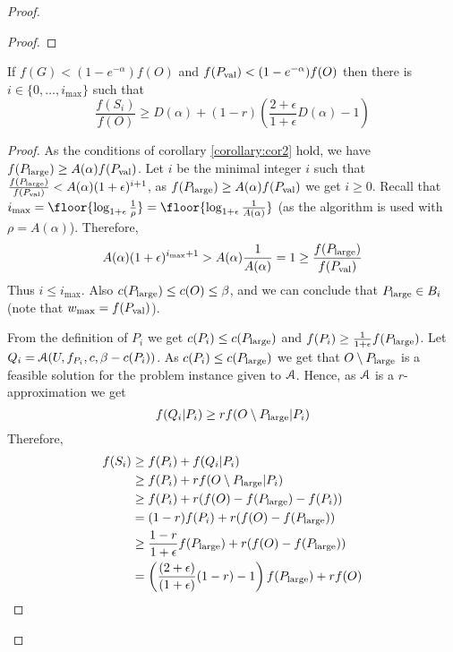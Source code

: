 \documentclass[a4paper,UKenglish,cleveref, autoref]{lipics-v2019}
\begin{document}
\begin{proof}
\begin{proof}
			
		\end{proof}

	\begin{corollary}
		\label{corollary:cor3}
			If $f(G)< (1-e^{-\alpha})f(O)$ and $f(P_{\text{val}}) < (1-e^{-\alpha})f(O)$ then
			there is $i\in \{0, \ldots, i_{\max}\}$ such that
		$$\frac{f(S_i)}{f(O)} \geq D(\alpha) + (1-r)\left( \frac{2+\epsilon}{1+\epsilon} D(\alpha) -1 \right)$$
	\end{corollary}
\begin{proof}
		As the conditions of corollary \ref{corollary:cor2} hold, we have
		$f(P_{\text{large}}) \geq A(\alpha) f(P_{\text{val}})$.
		 Let $i$ be the minimal integer $i$ such
		that $\frac{f(P_{\text{large}})}{f(P_{\text{val}})} < A(\alpha)(1+\epsilon) ^{i+1}$, as $f(P_{\text{large}}) \geq A(\alpha) f(P_{\text{val}})$ we get $i\geq 0$.
		Recall that $i_{\max}= \floor{\log_{1+\epsilon} \frac{1}{\rho} } =
		\floor{\log_{1+\epsilon} \frac{1}{A(\alpha)}} $ (as the algorithm is used
			with $\rho=A(\alpha)$).
			Therefore,
			$$A(\alpha) (1+\epsilon) ^{i_{\max} +1}
			> A(\alpha) \frac{1}{A(\alpha) } = 1 \geq \frac{f(P_{\text{large}})}{f(P_{\text{val}})}$$
			Thus $i\leq i_{\max}$.
			Also $c(P_{\text{large}}) \leq c(O) \leq \beta$, and we can conclude that
			$P_{\text{large}} \in B_i$ (note that $w_{\max} = f(P_{\text{val}})$).
			
			From the definition of $P_i$ we get $c(P_i)\leq c(P_{\text{large}})$ and
			$f(P_i) \geq \frac{1}{1+\epsilon} f(P_{\text{large}})$.
			Let $Q_i  =  \mathcal{A}(U, f_{P_i}, c, \beta - c(P_i))$.
			As $c(P_i) \leq c(P_{\text{large}})$ we get that $O\setminus P_{\text{large}}$
			is a feasible solution for the problem instance given to $\mathcal{A}$.
			Hence, as $\mathcal{A}$ is a $r$-approximation we get
			$$f(Q_i | P_i) \geq r f(O\setminus P_{\text{large}}| P_i)$$
			Therefore,
			\begin{align*}
			f(S_{i})
			&
			\geq f(P_i) + f(Q_i|P_i)
			\\ &
			\geq f(P_i) + r f(O \setminus P_{\text{large}} | P_i)
			\\ &
			\geq f(P_i) + r(f(O) - f(P_{\text{large}}) - f(P_i))
			\\ &
			= (1-r)f(P_i) + r(f(O) - f(P_{\text{large}}))
			\\ &
			\geq \frac{1-r}{1 + \epsilon}f(P_{\text{large}}) + r(f(O) - f(P_{\text{large}}))
			\\ &
			= \left(
			\frac{(2 + \epsilon)}{(1 + \epsilon)}(1-r) - 1
			\right)
			f(P_{\text{large}})
			+ rf(O)
			\label{eq:sub:bucket}
			\end{align*}
			

\end{proof}
\end{proof}
\end{document}
